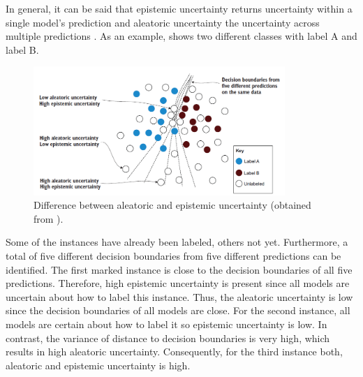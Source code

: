In general, it can be said that epistemic uncertainty returns uncertainty within a single model's prediction and aleatoric uncertainty the uncertainty across multiple predictions \cite{human-in-the-loop}.
As an example,  shows two different classes with label A and label B.
\begin{figure}[H]
  \centering
    \includegraphics[width=0.85\textwidth]{figures/uncertainty_differences.PNG}
  \caption{Difference between aleatoric and epistemic uncertainty (obtained from \cite{human-in-the-loop}).}
  \label{fig:differences_aleatoric_epistemic}
\end{figure}
Some of the instances have already been labeled, others not yet.
Furthermore, a total of five different decision boundaries from five different predictions can be identified.
The first marked instance is close to the decision boundaries of all five predictions.
Therefore, high epistemic uncertainty is present since all models are uncertain about how to label this instance.
Thus, the aleatoric uncertainty is low since the decision boundaries of all models are close.
For the second instance, all models are certain about how to label it so epistemic uncertainty is low.
In contrast, the variance of distance to decision boundaries is very high, which results in high aleatoric uncertainty.
Consequently, for the third instance both, aleatoric and epistemic uncertainty is high.